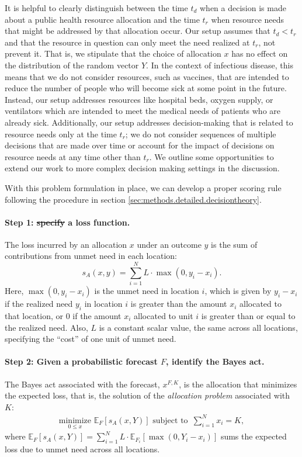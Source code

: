 \documentclass{article}\usepackage[]{graphicx}\usepackage[]{xcolor}
\providecommand{\DIFaddtex}[1]{{\protect\color{blue}\uwave{#1}}} %
\providecommand{\DIFdeltex}[1]{{\protect\color{red}\sout{#1}}}                      %
\providecommand{\DIFaddbegin}{} %
\providecommand{\DIFaddend}{} %
\providecommand{\DIFdelbegin}{} %
\providecommand{\DIFdelend}{} %
\providecommand{\DIFadd}[1]{\texorpdfstring{\DIFaddtex{#1}}{#1}} %
\providecommand{\DIFdel}[1]{\texorpdfstring{\DIFdeltex{#1}}{}} %
\newcommand{\DIFscaledelfig}{0.5}
\newlength{\DIFdelgraphicswidth} %
\newlength{\DIFdelgraphicsheight} %
\newcommand{\DIFaddincludegraphics}[2][]{{\color{blue}\fbox{\DIFOincludegraphics[#1]{#2}}}} %
\newcommand{\DIFdelincludegraphics}[2][]{%
\sbox{\DIFdelgraphicsbox}{\DIFOincludegraphics[#1]{#2}}%
\settoboxwidth{\DIFdelgraphicswidth}{\DIFdelgraphicsbox} %
\settoboxtotalheight{\DIFdelgraphicsheight}{\DIFdelgraphicsbox} %
\scalebox{\DIFscaledelfig}{%
\parbox[b]{\DIFdelgraphicswidth}{\usebox{\DIFdelgraphicsbox}\\[-\baselineskip] \rule{\DIFdelgraphicswidth}{0em}}\llap{\resizebox{\DIFdelgraphicswidth}{\DIFdelgraphicsheight}{%
\setlength{\unitlength}{\DIFdelgraphicswidth}%
\begin{picture}(1,1)%
\thicklines\linethickness{2pt} %
{\color[rgb]{1,0,0}\put(0,0){\framebox(1,1){}}}%
{\color[rgb]{1,0,0}\put(0,0){\line( 1,1){1}}}%
{\color[rgb]{1,0,0}\put(0,1){\line(1,-1){1}}}%
\end{picture}%
}\hspace*{3pt}}} %
} %
\DeclareRobustCommand{\DIFaddbegin}{\DIFOaddbegin \let\includegraphics\DIFaddincludegraphics} %
\DeclareRobustCommand{\DIFaddend}{\DIFOaddend \let\includegraphics\DIFOincludegraphics} %
\DeclareRobustCommand{\DIFdelbegin}{\DIFOdelbegin \let\includegraphics\DIFdelincludegraphics} %
\DeclareRobustCommand{\DIFdelend}{\DIFOaddend \let\includegraphics\DIFOincludegraphics} %
\begin{document}
It is helpful to clearly distinguish between the time $t_d$ when a decision is made about a public health
resource allocation and the time $t_r$ when resource needs that might be addressed by that allocation occur. Our
setup assumes that $t_d < t_r$ and that the resource in question can only meet the need realized at $t_r$, not prevent
it. That is, we stipulate that the choice of allocation $x$ has no effect on the distribution of the random vector $Y$. In the
context of infectious disease, this means that we do not consider resources, such as vaccines, that are intended to
reduce the number of people who will become sick at some point in the future. Instead, our setup addresses resources
like hospital beds, oxygen supply, or ventilators which are intended to meet the medical needs of patients who are
already sick. Additionally, our setup addresses decision-making that is related to resource needs only at the time
$t_r$; we do not consider sequences of multiple decisions that are made over time or account for the impact of decisions
on resource needs at any time other than $t_r$. We outline some opportunities to extend our work to more complex
decision making settings in the discussion.

With this problem formulation in place, we can develop a proper scoring rule following the procedure in section
\ref{sec:methods.detailed.decisiontheory}.

\paragraph{Step 1: \DIFdelbegin \DIFdel{specify }\DIFdelend \DIFaddbegin \DIFadd{Specify }\DIFaddend a loss function.} The loss incurred by an allocation $x$ under an outcome $y$ is the sum of
contributions from unmet need in each location:
\begin{equation}
  s_A(x, y) = \sum_{i=1}^N L \cdot \max(0, y_i - x_i). \label{eqn:loss_fn}
\end{equation}
Here, $\max(0, y_i - x_i)$ is the unmet need in location $i$, which is given by $y_i - x_i$ if the realized need $y_i$
in location $i$ is greater than the amount $x_i$ allocated to that location, or $0$ if the amount $x_i$ allocated to
unit $i$ is greater than or equal to the realized need. Also, $L$ is a constant scalar value, the same across all
locations, specifying the ``cost'' of one unit of unmet need.

\paragraph{Step 2: Given a probabilistic forecast $F$, identify the Bayes act.} The Bayes act associated with the
forecast, $x^{F,K}$, is the allocation that minimizes the expected loss, that is, the solution of the \emph{allocation
problem} associated with $K$:
\begin{align}
  \underset{0 \leq x}{\mathrm{minimize}}\,\, \mathbb{E}_{F} [s_A(x, Y)] \text{ subject to }
  \, \sum_{i=1}^N x_i = K, \label{eqn:AP}
\end{align}
where $\mathbb{E}_{F} [s_A(x, Y)] = \sum_{i=1}^{N} L \cdot \mathbb{E}_{F_i}[\max(0, Y_i - x_i)]$ sums the expected loss
due to unmet need across all locations.
\end{document}
